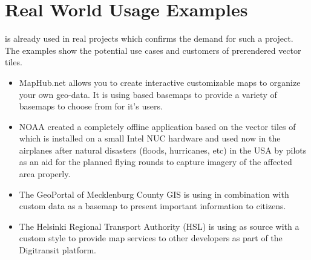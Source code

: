 \section{Real World Usage Examples}\label{part1_examples}

\osmvt{} is already used in real projects which confirms the demand for such a project. The examples show the potential use cases and customers of prerendered vector tiles.


\begin{itemize}
    \item MapHub.net allows you to create interactive customizable maps to organize your own geo-data. It is using \osmvt{} based basemaps to provide a variety of basemaps to choose from for it’s users.
    \item NOAA created a completely offline application based on the vector tiles of \osmvt{} which is installed on a small Intel NUC hardware and used now in the airplanes after natural disasters (floods, hurricanes, etc) in the USA by pilots as an aid for the planned flying rounds to capture imagery of the affected area properly.
    \item The GeoPortal of Mecklenburg County GIS is using \osmvt{} in combination with custom data as a basemap to present important information to citizens.
    \item The Helsinki Regional Transport Authority (HSL) is using \osmvt{} as source with a custom style to provide map services to other developers as part of the Digitransit platform.
\end{itemize}